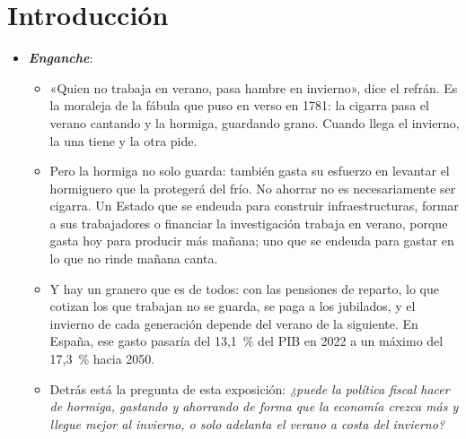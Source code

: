 \documentclass[11pt]{article}
\begin{document}
\tceetitulo

\section*{Introducción}

\begin{itemize}
\item \textbf{\emph{Enganche}}:
  \begin{itemize}
  \item «Quien no trabaja en verano, pasa hambre en invierno», dice el refrán. Es la moraleja de la fábula que  puso en verso en 1781: la cigarra pasa el verano cantando y la hormiga, guardando grano. Cuando llega el invierno, la una tiene y la otra pide.
  \item Pero la hormiga no solo guarda: también gasta su esfuerzo en levantar el hormiguero que la protegerá del frío. No ahorrar no es necesariamente ser cigarra. Un Estado que se endeuda para construir infraestructuras, formar a sus trabajadores o financiar la investigación trabaja en verano, porque gasta hoy para producir más mañana; uno que se endeuda para gastar en lo que no rinde mañana canta.
  \item Y hay un granero que es de todos: con las pensiones de reparto, lo que cotizan los que trabajan no se guarda, se paga a los jubilados, y el invierno de cada generación depende del verano de la siguiente. En España, ese gasto pasaría del 13,1~\% del PIB en 2022 a un máximo del 17,3~\% hacia 2050\nocite{CE2024AgeingReport}.
  \item Detrás está la pregunta de esta exposición: \emph{¿puede la política fiscal hacer de hormiga, gastando y ahorrando de forma que la economía crezca más y llegue mejor al invierno, o solo adelanta el verano a costa del invierno?}
  \end{itemize}


\end{itemize}
\end{document}

